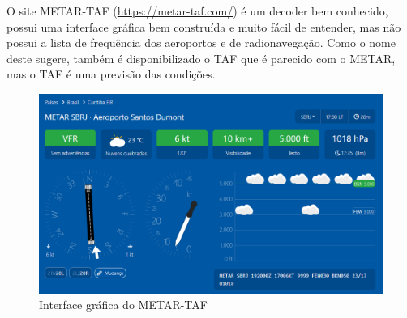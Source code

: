 O site METAR-TAF (\url{https://metar-taf.com/}) é um decoder bem conhecido, possui
uma interface gráfica bem construída e muito fácil de entender, mas não possui a
lista de frequência dos aeroportos e de radionavegação. Como o nome deste sugere,
também é disponibilizado o TAF que é parecido com o METAR, mas o TAF é uma 
previsão das condições.

\begin{figure}[ht]
    \begin{center}
    \includegraphics[width=400pt]{img/ui-metar-taf.png}
    \caption{Interface gráfica do METAR-TAF}
    \label{fig:metar-taf}
    \end{center}
\end{figure}
